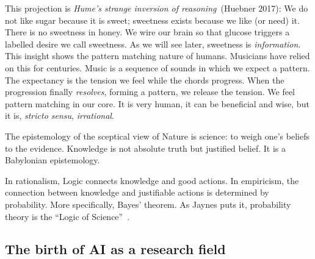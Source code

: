 \documentclass[
  letterpaper,
  12pt,
  british]{tufte-book}
\theoremstyle{plain}
\theoremstyle{definition}
\theoremstyle{plain}
\theoremstyle{remark}
\begin{document}
This projection is \emph{Hume's strange inversion of reasoning}~(Huebner
2017):
We do not like sugar because it is sweet; sweetness exists because we
like (or need) it. There is no sweetness in
honey.\protect\hypertarget{honey}{}{} We wire our brain so that glucose
triggers a labelled desire we call sweetness. As we will see later,
sweetness is \emph{information}. This insight shows the pattern matching
nature of humans. Musicians have relied on this for centuries. Music is
a sequence of sounds in which we expect a pattern. The expectancy is the
tension we feel while the chords progress. When the progression finally
\emph{resolves}, forming a pattern, we release the tension. We feel
pattern matching in our core. It is very human, it can be beneficial and
wise, but it is, \emph{stricto sensu}, \emph{irrational}.

The epistemology of the sceptical view of Nature is science: to weigh
one's beliefs to the evidence. Knowledge is not absolute truth but
justified belief. It is a Babylonian epistemology.

In rationalism, Logic connects knowledge and good actions. In
empiricism, the connection between knowledge and justifiable actions is
determined by probability. More specifically, Bayes' theorem. As Jaynes
puts it, probability theory is the ``Logic of Science''~. 

\hypertarget{the-birth-of-ai-as-a-research-field}{%
\subsection{The birth of AI as a research
field}\label{the-birth-of-ai-as-a-research-field}}
\end{document}
